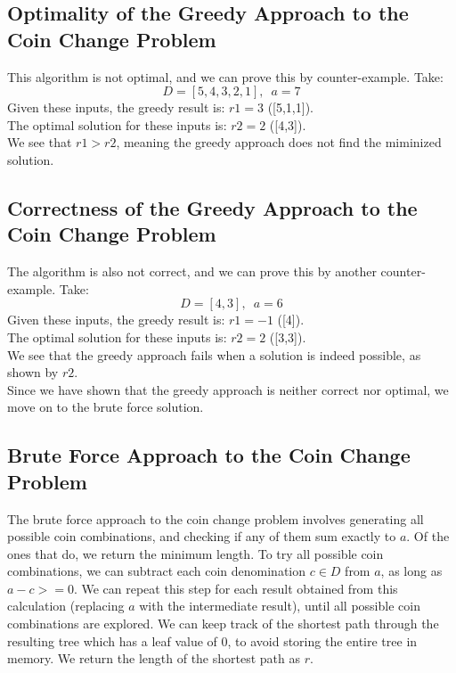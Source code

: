 \subsection{Optimality of the Greedy Approach to the Coin Change Problem}

This algorithm is not optimal, and we can prove this by counter-example.
Take:$$D = [5,4,3,2,1],\phantom{0} a = 7$$Given these inputs, the greedy result is: $r1 = 3$  ([5,1,1]).\\
The optimal solution for these inputs is: $r2 = 2$ ([4,3]).\\
We see that $r1 > r2$, meaning the greedy approach does not find the miminized solution.

\subsection{Correctness of the Greedy Approach to the Coin Change Problem}

The algorithm is also not correct, and we can prove this by another counter-example.
Take:$$D = [4,3],\phantom{0}a = 6$$Given these inputs, the greedy result is: $r1 = -1$  ([4]).\\
The optimal solution for these inputs is: $r2 = 2$ ([3,3]).\\
We see that the greedy approach fails when a solution is indeed possible, as shown by $r2$.\\
Since we have shown that the greedy approach is neither correct nor optimal, we move on to the brute force solution.\\

\subsection{Brute Force Approach to the Coin Change Problem}

The brute force approach to the coin change problem involves generating all possible coin combinations,
and checking if any of them sum exactly to $a$.
Of the ones that do, we return the minimum length.
To try all possible coin combinations, we can subtract each coin denomination $c \in D$ from $a$, as long as $a - c >= 0$.
We can repeat this step for each result obtained from this calculation (replacing $a$ with the intermediate result), until all possible coin combinations are explored.
We can keep track of the shortest path through the resulting tree which has a leaf value of 0, to avoid storing the entire tree in memory.
We return the length of the shortest path as $r$.\\

